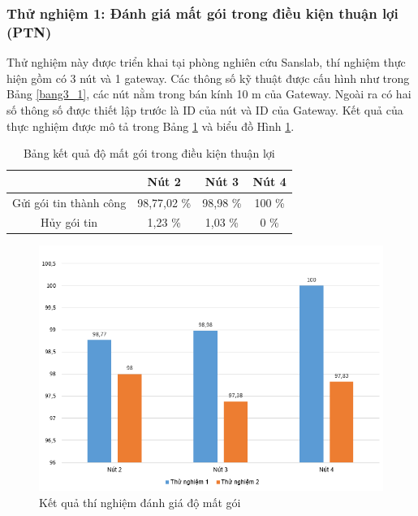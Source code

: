 \subsubsection{Thử nghiệm 1: Đánh giá mất gói trong điều kiện thuận lợi (PTN)}
Thử nghiệm này được triển khai tại phòng nghiên cứu Sanslab, thí nghiệm thực hiện gồm có 3 nút và 1 gateway. Các thông số kỹ thuật được cấu hình như trong Bảng \ref{bang3_1}, các nút nằm trong bán kính 10 m của Gateway. Ngoài ra có hai số thông số được thiết lập trước là ID của nút và ID của Gateway. Kết quả của thực nghiệm được mô tả trong Bảng \ref{TN1} và biểu đồ Hình \ref{sendrate}{}.\\
\begin{table}[h]
\centering
\caption{Bảng kết quả độ mất gói trong điều kiện thuận lợi}
\label{TN1}
\begin{tabular}{|c|c|c|c|}
\hline
 & Nút 2 & Nút 3 & Nút 4 \\
 \hline
 Gửi gói tin thành công & 98,77,02 \% & 98,98 \% & 100 \% \\
 \hline
 Hủy gói tin & 1,23 \% & 1,03 \% & 0 \% \\
 \hline
\end{tabular}
\end{table}
\begin{figure}
\centering
\includegraphics[scale=0.5]{image/sendrate}
\caption{Kết quả thí nghiệm đánh giá độ mất gói}
\label{sendrate}
\end{figure}
